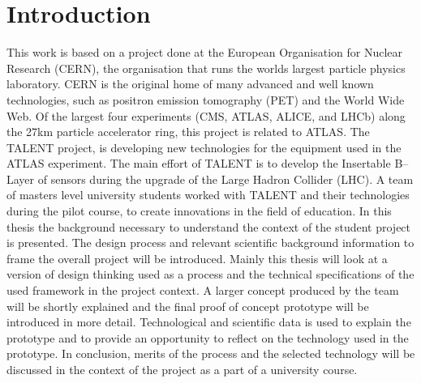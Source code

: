 \documentclass[english,12pt,a4paper,pdftex]{article}
\begin{document}
\cleardoublepage
\storeinipagenumber
{}
\setcounter{page}{1}


\section{Introduction}

\thispagestyle{empty}

This work is based on a project done at the European Organisation for Nuclear Research (CERN), the organisation that runs the worlds largest particle physics laboratory. CERN is the original home of many advanced and well known technologies, such as positron emission tomography (PET) and the World Wide Web. Of the largest four experiments (CMS, ATLAS, ALICE, and LHCb) along the 27km particle accelerator ring, this project is related to ATLAS.
The TALENT project, is developing new technologies for the equipment used in the ATLAS experiment. The main effort of TALENT is to develop the Insertable B--Layer of sensors during the upgrade of the Large Hadron Collider (LHC). A team of masters level university students worked with TALENT and their technologies during the pilot course, to create innovations in the field of education.
In this thesis the background necessary to understand the context of the student project is presented. The design process and relevant scientific background information to frame the overall project will be introduced. Mainly this thesis will look at a version of design thinking used as a process and the technical specifications of the used framework in the project context. A larger concept produced by the team will be shortly explained and the final proof of concept prototype will be introduced in more detail. Technological and scientific data is used to explain the prototype and to provide an opportunity to reflect on the technology used in the prototype. In conclusion, merits of the process and the selected technology will be discussed in the context of the project as a part of a university course.
\end{document}
